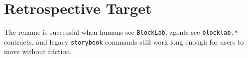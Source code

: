 \section{Retrospective Target}\label{record-134-retrospective-target}

The rename is successful when humans see \texttt{B\allowbreak{}l\allowbreak{}o\allowbreak{}c\allowbreak{}k\allowbreak{}L\allowbreak{}a\allowbreak{}b}, agents see \texttt{b\allowbreak{}l\allowbreak{}o\allowbreak{}c\allowbreak{}k\allowbreak{}l\allowbreak{}a\allowbreak{}b\allowbreak{}.\allowbreak{}*} contracts, and legacy \texttt{s\allowbreak{}t\allowbreak{}o\allowbreak{}r\allowbreak{}y\allowbreak{}b\allowbreak{}o\allowbreak{}o\allowbreak{}k} commands still work long enough for users to move without friction.

